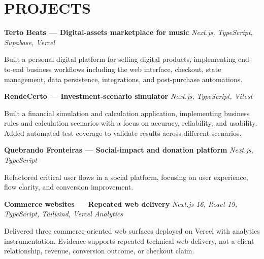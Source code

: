 \documentclass[10pt,a4paper]{article}
\begin{document}

\section*{PROJECTS}

\noindent
\textbf{Terto Beats — Digital-assets marketplace for music}
\hfill
\textit{Next.js, TypeScript, Supabase, Vercel}

\footnotesize

Built a personal digital platform for selling digital products,
implementing end-to-end business workflows including the web interface,
checkout, state management, data persistence, integrations,
and post-purchase automations.

\vspace{0.5pt}

\noindent
\textbf{RendeCerto — Investment-scenario simulator}
\hfill
\textit{Next.js, TypeScript, Vitest}

\footnotesize

Built a financial simulation and calculation application,
implementing business rules and calculation scenarios with a focus
on accuracy, reliability, and usability. Added automated test
coverage to validate results across different scenarios.

\vspace{0.5pt}

\noindent
\textbf{Quebrando Fronteiras — Social-impact and donation platform}
\hfill
\textit{Next.js, TypeScript}

\footnotesize

Refactored critical user flows in a social platform, focusing on
user experience, flow clarity, and conversion improvement.


\vspace{0.5pt}

\noindent
\textbf{Commerce websites — Repeated web delivery}
\hfill
\textit{Next.js 16, React 19, TypeScript, Tailwind, Vercel Analytics}

\footnotesize

Delivered three commerce-oriented web surfaces deployed on Vercel with analytics instrumentation. Evidence supports repeated technical web delivery, not a client relationship, revenue, conversion outcome, or checkout claim.
\end{document}
